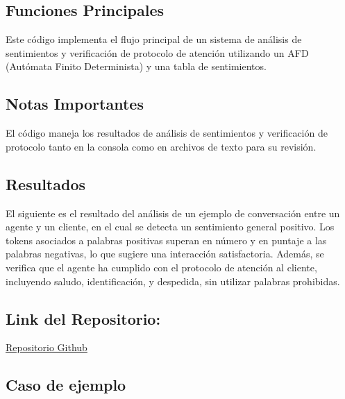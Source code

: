 \documentclass[12pt,a4paper]{article}
\begin{document}
\subsection*{Funciones Principales}

Este código implementa el flujo principal de un sistema de análisis de sentimientos y
verificación de protocolo de atención utilizando un AFD (Autómata Finito Determinista) y una
tabla de sentimientos.

\subsection*{Notas Importantes}
El código maneja los resultados de análisis de sentimientos y verificación de protocolo tanto
en la consola como en archivos de texto para su revisión.

\subsection{Resultados}
El siguiente es el resultado del análisis de un ejemplo de conversación entre un agente y un
cliente, en el cual se detecta un sentimiento general positivo. Los tokens asociados a palabras
positivas superan en número y en puntaje a las palabras negativas, lo que sugiere una
interacción satisfactoria. Además, se verifica que el agente ha cumplido con el protocolo de
atención al cliente, incluyendo saludo, identificación, y despedida, sin utilizar palabras
prohibidas.

\subsection*{Link del Repositorio:}
\href{https://github.com/AlexArce2000/tokenizador-tp-compiladores}{Repositorio Github}

\subsection*{Caso de ejemplo}
\end{document}
